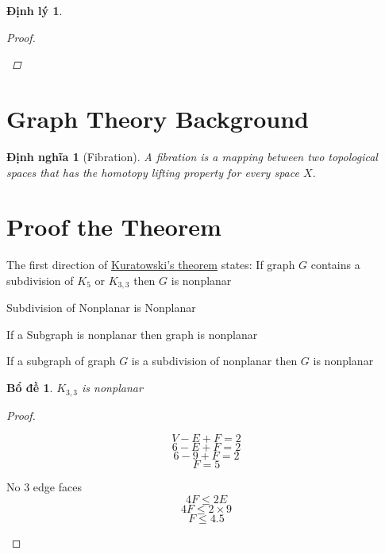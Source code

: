 \documentclass[12pt]{article}
\newtheorem{theorem}{Định lý}
\newtheorem{lemma}{Bổ đề}
\newtheorem{definition}{Định nghĩa}
\begin{document}
\begin{theorem}
\begin{proof}
\begin{center}
        \end{center}
    \end{proof}
\end{theorem}

\section{Graph Theory Background}
\begin{definition}[Fibration]
    A fibration is a mapping between two topological spaces that has the homotopy lifting property for every space $X$.
\end{definition}

\section{Proof the Theorem}
The first direction of \hyperref[thr:kuratowski]{Kuratowski's theorem} states: If graph $G$ contains a subdivision of $K_5$ or $K_{3,3}$ then $G$ is nonplanar

Subdivision of Nonplanar is Nonplanar

If a Subgraph is nonplanar then graph is nonplanar

If a subgraph of graph $G$ is a subdivision of nonplanar then $G$ is nonplanar
\begin{lemma}
    $K_{3,3}$ is nonplanar
\end{lemma}
\begin{proof}

    \begin{multicols}{3}
        $$V-E+F=2$$
        $$6-E+F=2$$
        $$6-9+F=2$$
        $$F=5$$

        No 3 edge faces
        $$4F \leq 2E$$
        $$4F \leq 2 \times 9$$
        $$ F \leq 4.5$$
    \end{multicols}
\end{proof}
\end{document}

